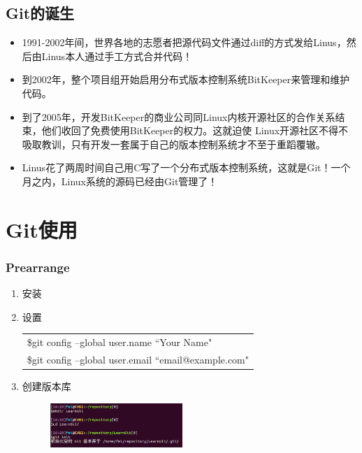 \documentclass[notheorems,mathserif,table,compress]{beamer}  %
\begin{document}
\subsection{Git的诞生}

\begin{frame}
  \begin{itemize}
  \item 1991-2002年间，世界各地的志愿者把源代码文件通过diff的方式发给Linus，然后由Linus本人通过手工方式合并代码！
  \item 到2002年，整个项目组开始启用分布式版本控制系统BitKeeper来管理和维护代码。
  \item 到了2005年，开发BitKeeper的商业公司同Linux内核开源社区的合作关系结束，他们收回了免费使用BitKeeper的权力。这就迫使 Linux开源社区不得不吸取教训，只有开发一套属于自己的版本控制系统才不至于重蹈覆辙。
  \item Linus花了两周时间自己用C写了一个分布式版本控制系统，这就是Git！一个月之内，Linux系统的源码已经由Git管理了！
  \end{itemize}
\end{frame}

\section{Git使用}

\begin{frame}
  \frametitle{Prearrange}
  \flushleft
  \begin{enumerate}
  \item 安装
  \item 设置
  \newline
  \begin{tabular}{|l|}
  \hline
  \$git config --global user.name ``Your Name" \\
  \$git config --global user.email ``email@example.com"\\
  \hline
  \end{tabular}
  \item 创建版本库
  \begin{figure}[h]
  \centerline{\includegraphics[width=5cm]{repository.png}}
  \end{figure}
  \end{enumerate}
\end{frame}
\end{document}
